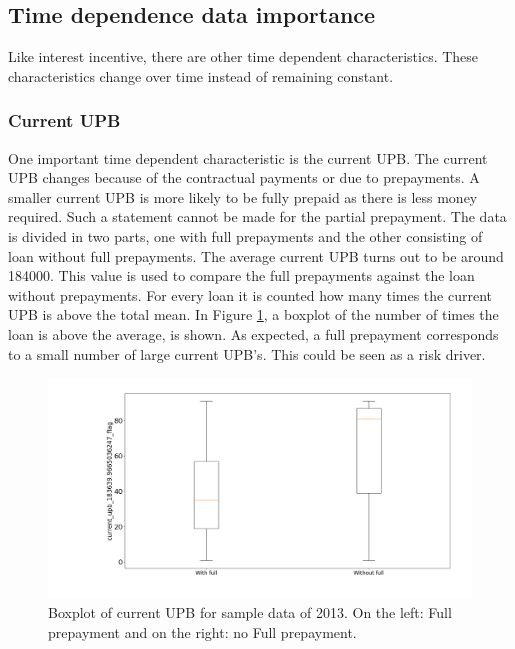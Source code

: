 \subsection{Time dependence data importance}
    Like interest incentive, there are other time
    dependent characteristics. These characteristics change over time instead of remaining constant.
    
    \subsubsection{Current UPB}
    One important time dependent
    characteristic is the current UPB. The current UPB changes
    because of the contractual payments or due to prepayments. 
    A smaller current UPB is more likely to be fully prepaid as
    there is less money required. Such a statement cannot be made
    for the partial prepayment. The data is divided in two parts,
    one with full prepayments and the other consisting of loan
    without full prepayments. The average current UPB turns out to
    be around 184000. This value is used to compare the full
    prepayments against the loan without prepayments. For every loan
    it is counted how many times the current UPB is above the total mean. In Figure \ref{Model_boxplot_current_upb_2013}, a boxplot of the number of times the loan is above the average, is shown. As expected, a full prepayment corresponds to a small number of large current UPB's. This could be seen as a risk driver. 
    
\begin{figure}[H]
    \centering
    \includegraphics[width=\linewidth]{Latex/Report/Figures/current_upb_2013.png}
    \caption{Boxplot of current UPB for sample data of 2013.  On the left: Full prepayment and on the right: no Full prepayment.}
    \label{Model_boxplot_current_upb_2013}
\end{figure}
    

